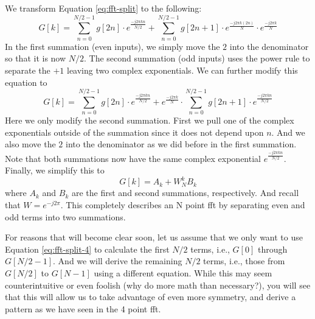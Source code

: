 We transform Equation \ref{eq:fft-split} to the following:
\begin{equation}
G[k] = \displaystyle\sum\limits_{n=0}^{N/2-1} g[2n] \cdot e^{\frac{-j 2 \pi k n}{N/2}} + \displaystyle\sum\limits_{n=0}^{N/2-1} g[2n+1] \cdot e^{\frac{-j 2 \pi k (2n)}{N}} \cdot e^{\frac{-j 2 \pi k}{N}}
\label{eq:fft-split-2}
\end{equation}
In the first summation (even inputs), we simply move the $2$ into the denominator so that it is now $N/2$. The second summation (odd inputs) uses the power rule to separate the $+1$ leaving two complex exponentials. We can further modify this equation to
\begin{equation}
G[k] = \displaystyle\sum\limits_{n=0}^{N/2-1} g[2n] \cdot e^{\frac{-j 2 \pi k n}{N/2}} + e^{\frac{-j 2 \pi k}{N}} \cdot \displaystyle\sum\limits_{n=0}^{N/2-1} g[2n+1] \cdot e^{\frac{-j 2 \pi k n}{N/2}} 
\label{eq:fft-split-3}
\end{equation}
Here we only modify the second summation. First we pull one of the complex exponentials outside of the summation since it does not depend upon $n$. And we also move the $2$ into the denominator as we did before in the first summation. Note that both summations now have the same complex exponential $e^{\frac{-j 2 \pi k n}{N/2}}$. Finally, we simplify this to 
\begin{equation}
G[k] = A_k + W_N^k B_k 
\label{eq:fft-split-4}
\end{equation} where $A_k$ and $B_k$ are the first and second summations, respectively. And recall that $W = e^{-j 2 \pi}$. This completely describes an N point \gls{fft} by separating even and odd terms into two summations.

For reasons that will become clear soon, let us assume that we only want to use Equation \ref{eq:fft-split-4} to calculate the first $N/2$ terms, i.e., $G[0]$ through $G[N/2 -1]$. And we will derive the remaining $N/2$ terms, i.e., those from $G[N/2]$ to $G[N-1]$ using a different equation. While this may seem counterintuitive or even foolish (why do more math than necessary?), you will see that this will allow us to take advantage of even more symmetry, and derive a pattern as we have seen in the 4 point \gls{fft}.

